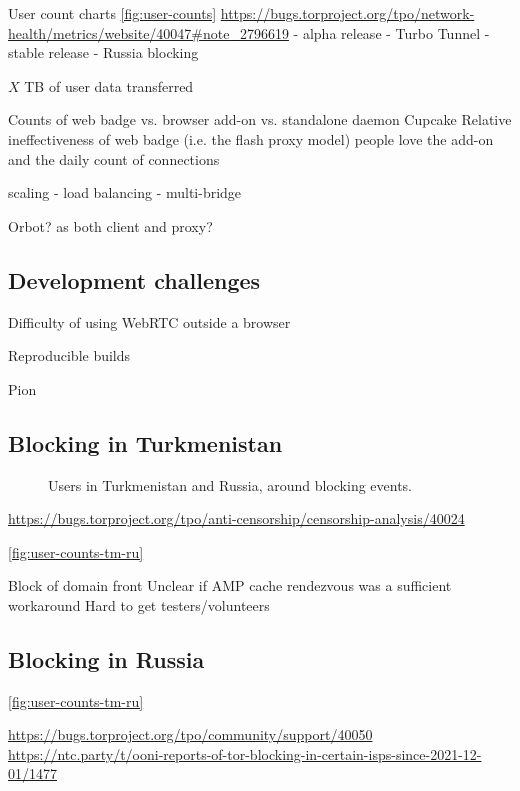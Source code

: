\documentclass[letterpaper,twocolumn]{article}
\begin{document}
User count charts \autoref{fig:user-counts}
\url{https://bugs.torproject.org/tpo/network-health/metrics/website/40047\#note\_2796619}
- alpha release
- Turbo Tunnel
- stable release
- Russia blocking

$X$ TB of user data transferred

Counts of web badge vs. browser add-on vs. standalone daemon
Cupcake
Relative ineffectiveness of web badge (i.e. the flash proxy model)
people love the add-on and the daily count of connections

scaling
- load balancing
- multi-bridge

Orbot? as both client and proxy?

\subsection{Development challenges}


Difficulty of using WebRTC outside a browser

Reproducible builds

Pion

\subsection{Blocking in Turkmenistan}

\begin{figure}
\caption{
Users in Turkmenistan and Russia,
around blocking events.
}
\label{fig:user-counts-tm-ru}
\end{figure}

\url{https://bugs.torproject.org/tpo/anti-censorship/censorship-analysis/40024}

\autoref{fig:user-counts-tm-ru}

Block of domain front
Unclear if AMP cache rendezvous was a sufficient workaround
Hard to get testers/volunteers

\subsection{Blocking in Russia}


\autoref{fig:user-counts-tm-ru}

\url{https://bugs.torproject.org/tpo/community/support/40050}
\url{https://ntc.party/t/ooni-reports-of-tor-blocking-in-certain-isps-since-2021-12-01/1477}
\end{document}

